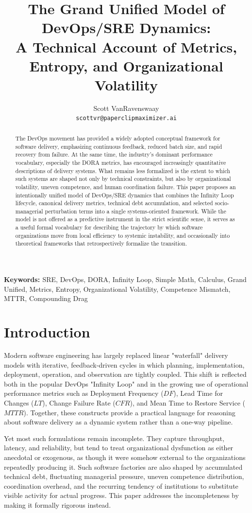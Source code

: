 \documentclass[letterpaper]{article}
\title{The Grand Unified Model of DevOps/SRE Dynamics:\\
\large A Technical Account of Metrics, Entropy, and Organizational Volatility}
\author{Scott VanRavenswaay\\ \texttt{scottvr@paperclipmaximizer.ai}}
\date{}
\providecommand{\keywords}[1]{\textbf{Keywords:  \textit{}} #1}
\begin{document}
\maketitle

\begin{abstract}
The DevOps movement has provided a widely adopted conceptual framework for software delivery, emphasizing continuous feedback, reduced batch size, and rapid recovery from failure. At the same time, the industry's dominant performance vocabulary, especially the DORA metrics, has encouraged increasingly quantitative descriptions of delivery systems. What remains less formalized is the extent to which such systems are shaped not only by technical constraints, but also by organizational volatility, uneven competence, and human coordination failure. This paper proposes an intentionally unified model of DevOps/SRE dynamics that combines the Infinity Loop lifecycle, canonical delivery metrics, technical debt accumulation, and selected socio-managerial perturbation terms into a single systems-oriented framework. While the model is not offered as a predictive instrument in the strict scientific sense, it serves as a useful formal vocabulary for describing the trajectory by which software organizations move from local efficiency to systemic instability, and occasionally into theoretical frameworks that retrospectively formalize the transition.
\end{abstract}

\keywords{SRE, DevOps, DORA, Infinity Loop, Simple Math, Calculus, Grand Unified, Metrics, Entropy, Organizational Volatility, Competence Mismatch, MTTR, Compounding Drag}


\section{Introduction}
Modern software engineering has largely replaced linear "waterfall" delivery models with iterative, feedback-driven cycles in which planning, implementation, deployment, operation, and observation are tightly coupled. This shift is reflected both in the popular DevOps "Infinity Loop" and in the growing use of operational performance metrics such as Deployment Frequency ($DF$), Lead Time for Changes ($LT$), Change Failure Rate ($CFR$), and Mean Time to Restore Service ($MTTR$). Together, these constructs provide a practical language for reasoning about software delivery as a dynamic system rather than a one-way pipeline.

Yet most such formulations remain incomplete. They capture throughput, latency, and reliability, but tend to treat organizational dysfunction as either anecdotal or exogenous, as though it were somehow external to the organizations repeatedly producing it. Such software factories are also shaped by accumulated technical debt, fluctuating managerial pressure, uneven competence distribution, coordination overhead, and the recurring tendency of institutions to substitute visible activity for actual progress. This paper addresses the incompleteness by making it formally rigorous instead.
\end{document}
